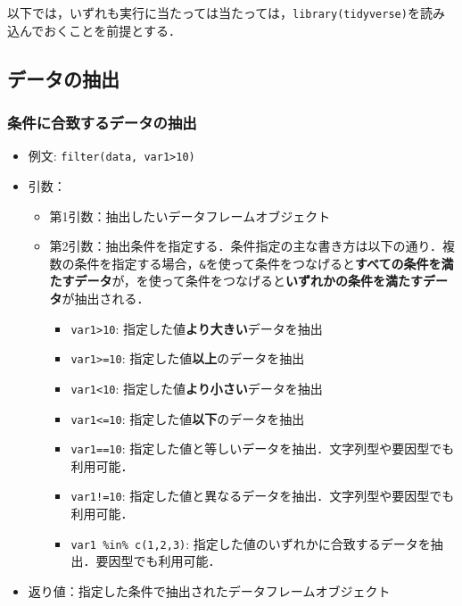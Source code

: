 \documentclass[
  xelatex, ja=standard]{bxjsarticle}
\providecommand{\tightlist}{%
  \setlength{\itemsep}{0pt}\setlength{\parskip}{0pt}}
\begin{document}
以下では，いずれも実行に当たっては当たっては，\texttt{library(tidyverse)}を読み込んでおくことを前提とする．

\subsection{データの抽出}\label{ux30c7ux30fcux30bfux306eux62bdux51fa}

\subsubsection{条件に合致するデータの抽出}\label{ux6761ux4ef6ux306bux5408ux81f4ux3059ux308bux30c7ux30fcux30bfux306eux62bdux51fa}

\begin{itemize}
\tightlist
\item
  例文: \texttt{filter(data,\ var1\textgreater{}10)}
\item
  引数：

  \begin{itemize}
  \tightlist
  \item
    第1引数：抽出したいデータフレームオブジェクト
  \item
    第2引数：抽出条件を指定する．条件指定の主な書き方は以下の通り．複数の条件を指定する場合，\texttt{\&}を使って条件をつなげると\textbf{すべての条件を満たすデータ}が，\texttt{\textbar{}}を使って条件をつなげると\textbf{いずれかの条件を満たすデータ}が抽出される．

    \begin{itemize}
    \tightlist
    \item
      \texttt{var1\textgreater{}10}:
      指定した値\textbf{より大きい}データを抽出
    \item
      \texttt{var1\textgreater{}=10}:
      指定した値\textbf{以上}のデータを抽出
    \item
      \texttt{var1\textless{}10}:
      指定した値\textbf{より小さい}データを抽出
    \item
      \texttt{var1\textless{}=10}: 指定した値\textbf{以下}のデータを抽出
    \item
      \texttt{var1==10}:
      指定した値と等しいデータを抽出．文字列型や要因型でも利用可能．
    \item
      \texttt{var1!=10}:
      指定した値と異なるデータを抽出．文字列型や要因型でも利用可能．
    \item
      \texttt{var1\ \%in\%\ c(1,2,3)}:
      指定した値のいずれかに合致するデータを抽出．要因型でも利用可能．
    \end{itemize}
  \end{itemize}
\item
  返り値：指定した条件で抽出されたデータフレームオブジェクト
\end{itemize}
\end{document}
